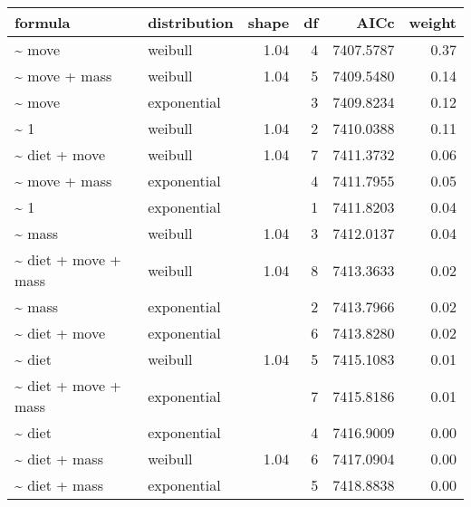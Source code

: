 \begin{table}[ht]
\centering
\begin{tabular}{llrrrr}
 formula & distribution & shape & df & AICc & weight \\ 
  \hline
\~{} move & weibull & 1.04 & 4 & 7407.5787 & 0.37 \\ 
  \~{} move + mass & weibull & 1.04 & 5 & 7409.5480 & 0.14 \\ 
  \~{} move & exponential &  & 3 & 7409.8234 & 0.12 \\ 
  \~{} 1 & weibull & 1.04 & 2 & 7410.0388 & 0.11 \\ 
  \~{} diet + move & weibull & 1.04 & 7 & 7411.3732 & 0.06 \\ 
  \~{} move + mass & exponential &  & 4 & 7411.7955 & 0.05 \\ 
  \~{} 1 & exponential &  & 1 & 7411.8203 & 0.04 \\ 
  \~{} mass & weibull & 1.04 & 3 & 7412.0137 & 0.04 \\ 
  \~{} diet + move + mass & weibull & 1.04 & 8 & 7413.3633 & 0.02 \\ 
  \~{} mass & exponential &  & 2 & 7413.7966 & 0.02 \\ 
  \~{} diet + move & exponential &  & 6 & 7413.8280 & 0.02 \\ 
  \~{} diet & weibull & 1.04 & 5 & 7415.1083 & 0.01 \\ 
  \~{} diet + move + mass & exponential &  & 7 & 7415.8186 & 0.01 \\ 
  \~{} diet & exponential &  & 4 & 7416.9009 & 0.00 \\ 
  \~{} diet + mass & weibull & 1.04 & 6 & 7417.0904 & 0.00 \\ 
  \~{} diet + mass & exponential &  & 5 & 7418.8838 & 0.00 \\ 
  \end{tabular}
\label{tab:na}
\end{table}
